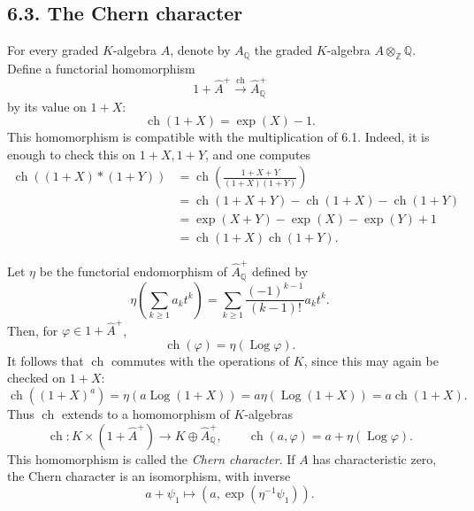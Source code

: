 \documentclass[11pt]{article}
\theoremstyle{plain}
\theoremstyle{definition}
\theoremstyle{remark}
\newcommand{\QQ}{\mathbb Q}
\newcommand{\ZZ}{\mathbb Z}
\providecommand{\ch}{\operatorname{ch}}
\providecommand{\Log}{\operatorname{Log}}
\begin{document}
\subsection*{6.3. The Chern character}
For every graded $K$-algebra $A$, denote by $A_{\QQ}$ the graded $K$-algebra $A\otimes_{\ZZ}\QQ$. Define a functorial homomorphism
\[
1+\widehat A^+\xrightarrow{\ch}\widehat A_{\QQ}^+
\]
by its value on $1+X$:
\begin{equation}\label{eq:6.3.1}
\ch(1+X)=\exp(X)-1.
\end{equation}
This homomorphism is compatible with the multiplication of 6.1. Indeed, it is enough to check this on $1+X,1+Y$, and one computes
\begin{align*}
\ch((1+X)*(1+Y))
&=\ch\left(\frac{1+X+Y}{(1+X)(1+Y)}\right)\\
&=\ch(1+X+Y)-\ch(1+X)-\ch(1+Y)\\
&=\exp(X+Y)-\exp(X)-\exp(Y)+1\\
&=\ch(1+X)\ch(1+Y).
\end{align*}

Let $\eta$ be the functorial endomorphism of $\widehat A_{\QQ}^+$ defined by
\[
\eta\left(\sum_{k\geq 1}a_kt^k\right)=\sum_{k\geq 1}\frac{(-1)^{k-1}}{(k-1)!}a_kt^k.
\]
Then, for $\varphi\in 1+\widehat A^+$,
\begin{equation}\label{eq:6.3.2}
\ch(\varphi)=\eta(\Log\varphi).
\end{equation}
It follows that $\ch$ commutes with the operations of $K$, since this may again be checked on $1+X$:
\[
\ch((1+X)^a)=\eta(a\Log(1+X))=a\eta(\Log(1+X))=a\ch(1+X).
\]
Thus $\ch$ extends to a homomorphism of $K$-algebras
\begin{equation}\label{eq:6.3.3}
\ch:K\times(1+\widehat A^+)\longrightarrow K\oplus\widehat A_{\QQ}^+,
\qquad
\ch(a,\varphi)=a+\eta(\Log\varphi).
\end{equation}
This homomorphism is called the \emph{Chern character}. If $A$ has characteristic zero, the Chern character is an isomorphism, with inverse
\[
a+\psi_1\longmapsto (a,\exp(\eta^{-1}\psi_1)).
\]
\end{document}
